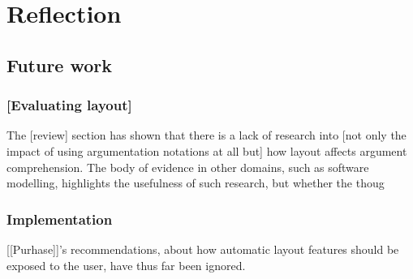 \chapter{Reflection}


\section{Future work}

\subsection{[Evaluating layout]}

The [review] section has shown that there is a lack of research into [not only the impact of using argumentation notations at all but] how layout affects argument comprehension. The body of evidence in other domains, such as software modelling, highlights the usefulness of such research, but whether the thoug


\subsection{Implementation}

[[Purhase]]'s recommendations, about how automatic layout features should be exposed to the user, have thus far been ignored. 
